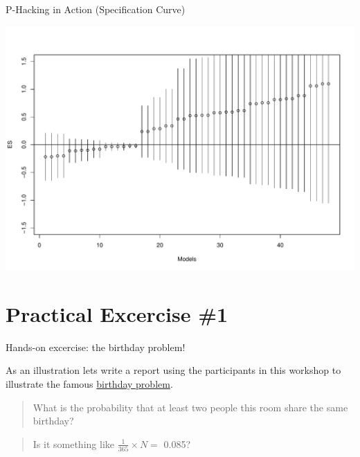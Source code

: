 \documentclass[ignorenonframetext,]{beamer}
\begin{document}
\begin{frame}{P-Hacking in Action (Specification Curve)}
\protect\hypertarget{p-hacking-in-action-specification-curve}{}

\includegraphics{slides_w_beamer_files/figure-beamer/spec curve-1.pdf}

\end{frame}

\hypertarget{practical-excercise-1}{%
\section{Practical Excercise \#1}\label{practical-excercise-1}}

\begin{frame}{Hands-on excercise: the birthday problem!}
\protect\hypertarget{hands-on-excercise-the-birthday-problem}{}

As an illustration lets write a report using the participants in this
workshop to illustrate the famous
\href{https://en.wikipedia.org/wiki/Birthday_problem}{birthday problem}.

\begin{quote}
What is the probability that at least two people this room share the
same birthday?
\end{quote}

\begin{quote}
Is it something like \(\frac{1}{365} \times N =\) 0.085?
\end{quote}

\end{frame}
\end{document}
